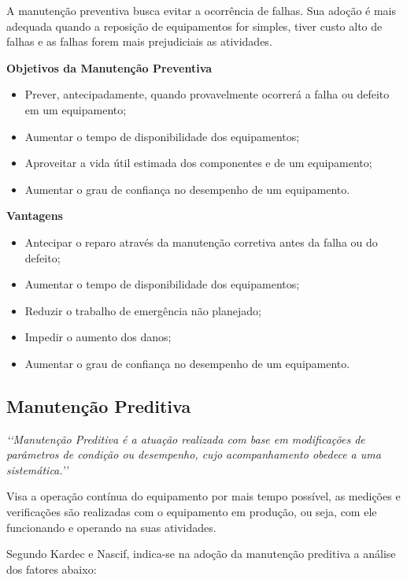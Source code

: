 		A manutenção preventiva busca evitar a ocorrência de falhas. Sua adoção é mais adequada quando a reposição de equipamentos for simples, tiver custo alto de falhas e as falhas forem mais prejudiciais as atividades.


		\textbf{Objetivos da Manutenção Preventiva}
			\begin{itemize}
				\item Prever, antecipadamente, quando provavelmente ocorrerá a falha ou defeito em um equipamento;    
				\item Aumentar o tempo de disponibilidade dos equipamentos; 
				\item Aproveitar a vida útil estimada dos componentes e de um equipamento; 
				\item Aumentar o grau de confiança no desempenho de um equipamento. 
			\end{itemize}

		\textbf{Vantagens}
			\begin{itemize}
				\item Antecipar o reparo através da manutenção corretiva antes da falha ou do defeito;    
				\item Aumentar o tempo de disponibilidade dos equipamentos; 
				\item Reduzir o trabalho de emergência não planejado; 
				\item Impedir o aumento dos danos; 
				\item Aumentar o grau de confiança no desempenho de um equipamento.
			\end{itemize}


\subsection{Manutenção Preditiva}

		\emph{\lq\lq Manutenção Preditiva é a atuação realizada com base em modificações de parâmetros de condição ou desempenho, cujo acompanhamento obedece a uma sistemática.\rq\rq} \cite{kardecnascif2010}

		Visa a operação contínua do equipamento por mais tempo possível, as medições e verificações são realizadas com o equipamento em produção, ou seja, com ele funcionando e operando na suas atividades. 

		Segundo Kardec e Nascif, indica-se na adoção da manutenção preditiva a análise dos fatores abaixo:

